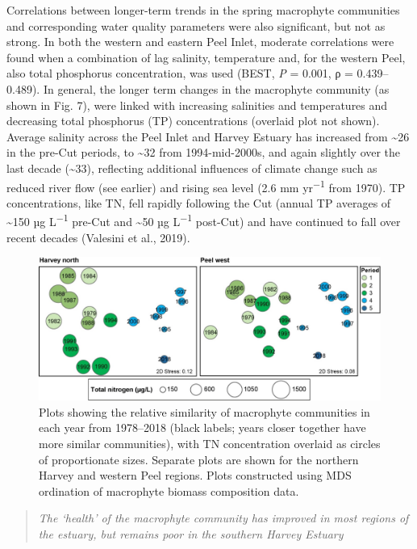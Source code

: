 \documentclass[
]{book}
\begin{document}
Correlations between longer-term trends in the spring macrophyte communities and corresponding water quality parameters were also significant, but not as strong. In both the western and eastern Peel Inlet, moderate correlations were found when a combination of lag salinity, temperature and, for the western Peel, also total phosphorus concentration, was used (BEST, \emph{P} = 0.001, ρ = 0.439--0.489). In general, the longer term changes in the macrophyte community (as shown in Fig. 7), were linked with increasing salinities and temperatures and decreasing total phosphorus (TP) concentrations (overlaid plot not shown). Average salinity across the Peel Inlet and Harvey Estuary has increased from \textasciitilde26 in the pre-Cut periods, to \textasciitilde32 from 1994-mid-2000s, and again slightly over the last decade (\textasciitilde33), reflecting additional influences of climate change such as reduced river flow (see earlier) and rising sea level (2.6 mm yr\textsuperscript{−1} from 1970). TP concentrations, like TN, fell rapidly following the Cut (annual TP averages of \textasciitilde150 µg L\textsuperscript{−1} pre-Cut and \textasciitilde50 µg L\textsuperscript{−1} post-Cut) and have continued to fall over recent decades (Valesini et al., 2019).

\begin{figure}
\includegraphics[width=1\linewidth]{images/macrophytes/picture11} \caption{Plots showing the relative similarity of macrophyte communities in each year from 1978–2018 (black labels; years closer together have more similar communities), with TN concentration overlaid as circles of proportionate sizes. Separate plots are shown for the northern Harvey and western Peel regions. Plots constructed using MDS ordination of macrophyte biomass composition data.}\label{fig:macrophytes-pic11}
\end{figure}

\begin{quote}
\emph{The `health' of the macrophyte community has improved in most regions of the estuary, but remains poor in the southern Harvey Estuary}
\end{quote}
\end{document}
